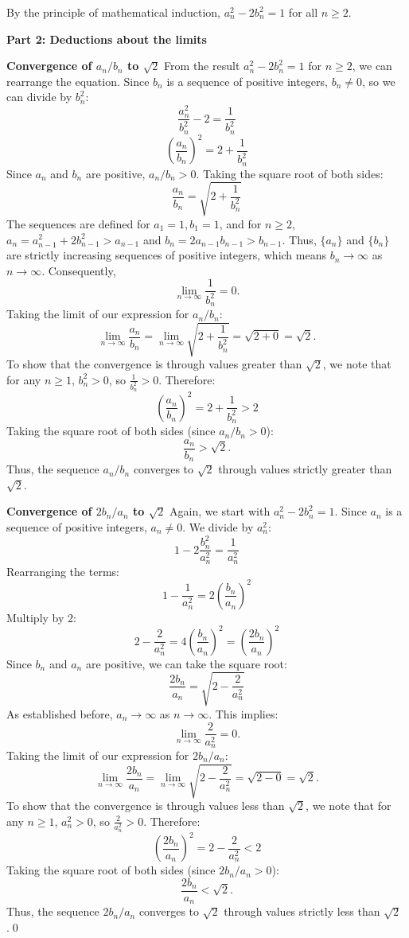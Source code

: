 By the principle of mathematical induction, $a_n^2 - 2b_n^2 = 1$ for all $n \geq 2$.

\textbf{Part 2: Deductions about the limits}

\textbf{Convergence of $a_n/b_n$ to $\sqrt{2}$}
From the result $a_n^2 - 2b_n^2 = 1$ for $n \geq 2$, we can rearrange the equation. Since $b_n$ is a sequence of positive integers, $b_n \neq 0$, so we can divide by $b_n^2$:
\[ \frac{a_n^2}{b_n^2} - 2 = \frac{1}{b_n^2} \]
\[ \left(\frac{a_n}{b_n}\right)^2 = 2 + \frac{1}{b_n^2} \]
Since $a_n$ and $b_n$ are positive, $a_n/b_n > 0$. Taking the square root of both sides:
\[ \frac{a_n}{b_n} = \sqrt{2 + \frac{1}{b_n^2}} \]
The sequences are defined for $a_1=1, b_1=1$, and for $n \geq 2$, $a_n = a_{n-1}^2+2b_{n-1}^2 > a_{n-1}$ and $b_n = 2a_{n-1}b_{n-1} > b_{n-1}$. Thus, $\{a_n\}$ and $\{b_n\}$ are strictly increasing sequences of positive integers, which means $b_n \to \infty$ as $n \to \infty$.
Consequently,
\[ \lim_{n \to \infty} \frac{1}{b_n^2} = 0. \]
Taking the limit of our expression for $a_n/b_n$:
\[ \lim_{n \to \infty} \frac{a_n}{b_n} = \lim_{n \to \infty} \sqrt{2 + \frac{1}{b_n^2}} = \sqrt{2+0} = \sqrt{2}. \]
To show that the convergence is through values greater than $\sqrt{2}$, we note that for any $n \geq 1$, $b_n^2 > 0$, so $\frac{1}{b_n^2} > 0$. Therefore:
\[ \left(\frac{a_n}{b_n}\right)^2 = 2 + \frac{1}{b_n^2} > 2 \]
Taking the square root of both sides (since $a_n/b_n > 0$):
\[ \frac{a_n}{b_n} > \sqrt{2}. \]
Thus, the sequence $a_n/b_n$ converges to $\sqrt{2}$ through values strictly greater than $\sqrt{2}$.

\textbf{Convergence of $2b_n/a_n$ to $\sqrt{2}$}
Again, we start with $a_n^2 - 2b_n^2 = 1$. Since $a_n$ is a sequence of positive integers, $a_n \neq 0$. We divide by $a_n^2$:
\[ 1 - 2\frac{b_n^2}{a_n^2} = \frac{1}{a_n^2} \]
Rearranging the terms:
\[ 1 - \frac{1}{a_n^2} = 2\left(\frac{b_n}{a_n}\right)^2 \]
Multiply by 2:
\[ 2 - \frac{2}{a_n^2} = 4\left(\frac{b_n}{a_n}\right)^2 = \left(\frac{2b_n}{a_n}\right)^2 \]
Since $b_n$ and $a_n$ are positive, we can take the square root:
\[ \frac{2b_n}{a_n} = \sqrt{2 - \frac{2}{a_n^2}} \]
As established before, $a_n \to \infty$ as $n \to \infty$. This implies:
\[ \lim_{n \to \infty} \frac{2}{a_n^2} = 0. \]
Taking the limit of our expression for $2b_n/a_n$:
\[ \lim_{n \to \infty} \frac{2b_n}{a_n} = \lim_{n \to \infty} \sqrt{2 - \frac{2}{a_n^2}} = \sqrt{2-0} = \sqrt{2}. \]
To show that the convergence is through values less than $\sqrt{2}$, we note that for any $n \geq 1$, $a_n^2 > 0$, so $\frac{2}{a_n^2} > 0$. Therefore:
\[ \left(\frac{2b_n}{a_n}\right)^2 = 2 - \frac{2}{a_n^2} < 2 \]
Taking the square root of both sides (since $2b_n/a_n > 0$):
\[ \frac{2b_n}{a_n} < \sqrt{2}. \]
Thus, the sequence $2b_n/a_n$ converges to $\sqrt{2}$ through values strictly less than $\sqrt{2}$.\qed
\medskip



